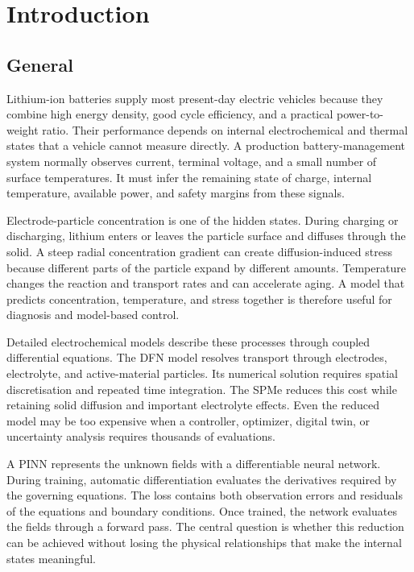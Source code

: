 \documentclass[14pt,a4paper,oneside]{extreport}
\begin{document}
\clearpage
{}
\setcounter{page}{1}

\chapter{Introduction}
\label{chap:intro}
\section{General}
\label{sec:intro-first}
Lithium-ion batteries supply most present-day electric vehicles because they combine high energy density, good cycle efficiency, and a practical power-to-weight ratio. Their performance depends on internal electrochemical and thermal states that a vehicle cannot measure directly. A production battery-management system normally observes current, terminal voltage, and a small number of surface temperatures. It must infer the remaining state of charge, internal temperature, available power, and safety margins from these signals.

Electrode-particle concentration is one of the hidden states. During charging or discharging, lithium enters or leaves the particle surface and diffuses through the solid. A steep radial concentration gradient can create diffusion-induced stress because different parts of the particle expand by different amounts. Temperature changes the reaction and transport rates and can accelerate aging. A model that predicts concentration, temperature, and stress together is therefore useful for diagnosis and model-based control.

Detailed electrochemical models describe these processes through coupled differential equations. The DFN model resolves transport through electrodes, electrolyte, and active-material particles. Its numerical solution requires spatial discretisation and repeated time integration. The SPMe reduces this cost while retaining solid diffusion and important electrolyte effects. Even the reduced model may be too expensive when a controller, optimizer, digital twin, or uncertainty analysis requires thousands of evaluations.

A PINN represents the unknown fields with a differentiable neural network. During training, automatic differentiation evaluates the derivatives required by the governing equations. The loss contains both observation errors and residuals of the equations and boundary conditions. Once trained, the network evaluates the fields through a forward pass. The central question is whether this reduction can be achieved without losing the physical relationships that make the internal states meaningful.
\end{document}
